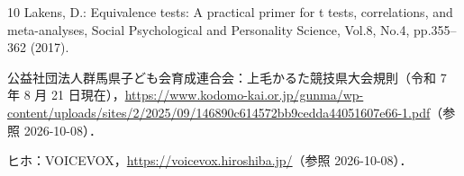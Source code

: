 \begin{thebibliography}{10}
Lakens, D.: Equivalence tests: A practical primer for t tests, correlations, and meta-analyses, Social Psychological and Personality Science, Vol.8, No.4, pp.355--362 (2017).

公益社団法人群馬県子ども会育成連合会：上毛かるた競技県大会規則（令和 7 年 8 月 21 日現在），\url{https://www.kodomo-kai.or.jp/gunma/wp-content/uploads/sites/2/2025/09/146890c614572bb9cedda44051607e66-1.pdf}（参照 2026-10-08）．

ヒホ：VOICEVOX，\url{https://voicevox.hiroshiba.jp/}（参照 2026-10-08）．

\end{thebibliography}

\begin{biography}
\end{biography}


